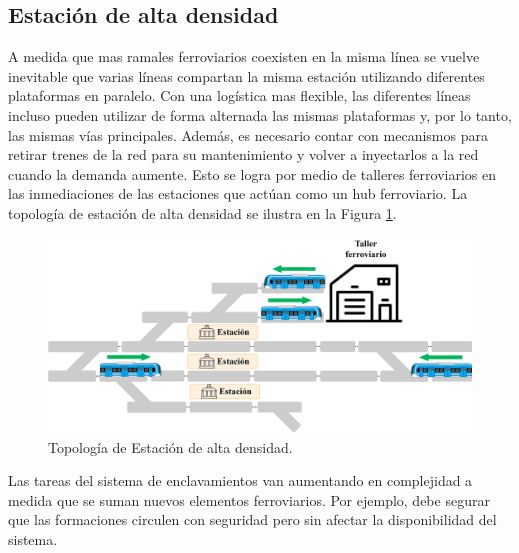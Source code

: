 \subsection{Estación de alta densidad}

A medida que mas ramales ferroviarios coexisten en la misma línea se vuelve inevitable que varias líneas compartan la misma estación utilizando diferentes plataformas en paralelo. Con una logística mas flexible, las diferentes líneas incluso pueden utilizar de forma alternada las mismas plataformas y, por lo tanto, las mismas vías principales. Además, es necesario contar con mecanismos para retirar trenes de la red para su mantenimiento y volver a inyectarlos a la red cuando la demanda aumente. Esto se logra por medio de talleres ferroviarios en las inmediaciones de las estaciones que actúan como un hub ferroviario. La topología de estación de alta densidad se ilustra en la Figura \ref{fig:hub_1}.

    \begin{figure}[H]
        \centering
        \includegraphics[width=1\textwidth]{Figuras/altaDensidad}
        \centering\caption{Topología de Estación de alta densidad.}
        \label{fig:hub_1}
    \end{figure}
    

Las tareas del sistema de enclavamientos van aumentando en complejidad a medida que se suman nuevos elementos ferroviarios. Por ejemplo, debe segurar que las formaciones circulen con seguridad pero sin afectar la disponibilidad del sistema. %